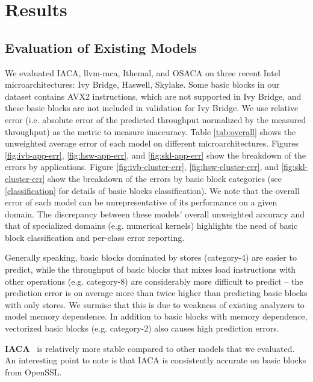 \section{Results}

\subsection{Evaluation of Existing Models}
We evaluated IACA, llvm-mca, Ithemal\cite{ithemal}, and OSACA\cite{osaca}
on three recent Intel microarchitectures: Ivy Bridge, Haswell, Skylake.
Some basic blocks in our dataset contains AVX2 instructions, which are not supported in Ivy Bridge,
and these basic blocks are not included in validation for Ivy Bridge.
We use relative error (i.e. absolute error of the predicted throughput normalized by the measured throughput)
as the metric to measure inaccuracy.
Table \ref{tab:overall} shows the unweighted average error
of each model on different microarchitectures.
Figures \ref{fig:ivb-app-err}, \ref{fig:hsw-app-err}, and \ref{fig:skl-app-err}
show the breakdown of the errors by applications.
Figure \ref{fig:ivb-cluster-err}, \ref{fig:hsw-cluster-err}, 
and \ref{fig:skl-cluster-err} show the breakdown of the errors by basic block categories 
(see \ref{classification} for details of basic blocks classification).
We note that the overall error of each model can be unrepresentative
of its performance on a given domain.
The discrepancy between these models' overall unweighted accuracy
and that of specialized domains (e.g. numerical kernels) highlights
the need of basic block classification and per-class error reporting.

Generally speaking, basic blocks dominated by stores
(category-4) are easier to predict,
while the throughput of basic blocks that mixes load instructions
with other operations (e.g. category-8) are considerably
more difficult to predict -- the prediction error is on average more than
twice higher than predicting basic blocks with only stores. 
We surmise that this is due to weakness of existing analyzers to model 
memory dependence.
In addition to basic blocks with memory dependence,
vectorized basic blocks (e.g. category-2) also causes high prediction errors.


\textbf{IACA}~\cite{iaca} is relatively more stable compared to other models that we evaluated.
An interesting point to note is that IACA is consistently accurate on basic blocks from OpenSSL.

